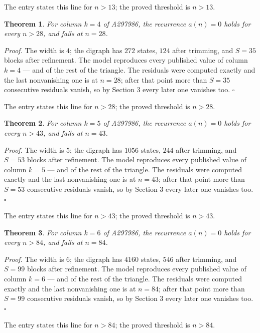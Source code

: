 \documentclass[11pt]{article}
\newtheorem{theorem}{Theorem}
\theoremstyle{definition}
\begin{document}
The entry states this line for $n > 13$; the proved threshold is $n > 13$.

\begin{theorem} For column $k = 4$ of A297986, the recurrence $a(n) = 0$ holds for every $n > 28$, and fails at $n = 28$.\end{theorem}

{\itshape Proof.} The width is $4$; the digraph has $272$ states, $124$ after trimming, and $S = 35$ blocks after refinement. The model reproduces every published value of column $k = 4$ --- and of the rest of the triangle. The residuals were computed exactly and the last nonvanishing one is at $n = 28$; after that point more than $S = 35$ consecutive residuals vanish, so by Section 3 every later one vanishes too. $\square$

The entry states this line for $n > 28$; the proved threshold is $n > 28$.

\begin{theorem} For column $k = 5$ of A297986, the recurrence $a(n) = 0$ holds for every $n > 43$, and fails at $n = 43$.\end{theorem}

{\itshape Proof.} The width is $5$; the digraph has $1056$ states, $244$ after trimming, and $S = 53$ blocks after refinement. The model reproduces every published value of column $k = 5$ --- and of the rest of the triangle. The residuals were computed exactly and the last nonvanishing one is at $n = 43$; after that point more than $S = 53$ consecutive residuals vanish, so by Section 3 every later one vanishes too. $\square$

The entry states this line for $n > 43$; the proved threshold is $n > 43$.

\begin{theorem} For column $k = 6$ of A297986, the recurrence $a(n) = 0$ holds for every $n > 84$, and fails at $n = 84$.\end{theorem}

{\itshape Proof.} The width is $6$; the digraph has $4160$ states, $546$ after trimming, and $S = 99$ blocks after refinement. The model reproduces every published value of column $k = 6$ --- and of the rest of the triangle. The residuals were computed exactly and the last nonvanishing one is at $n = 84$; after that point more than $S = 99$ consecutive residuals vanish, so by Section 3 every later one vanishes too. $\square$

The entry states this line for $n > 84$; the proved threshold is $n > 84$.
\end{document}
